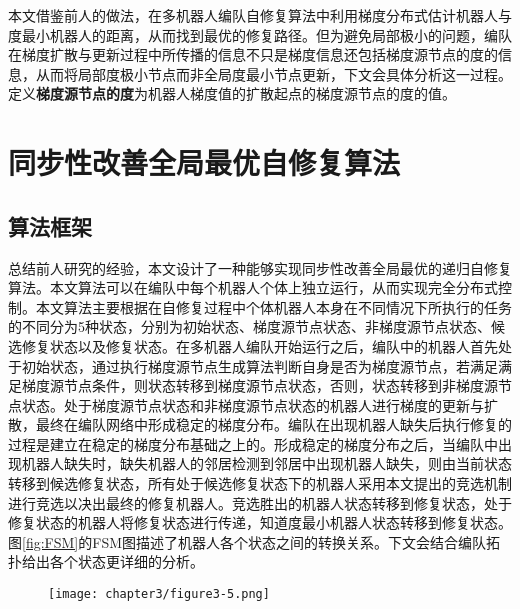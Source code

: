 本文借鉴前人的做法，在多机器人编队自修复算法中利用梯度分布式估计机器人与度最小机器人的距离，从而找到最优的修复路径。但为避免局部极小的问题，编队在梯度扩散与更新过程中所传播的信息不只是梯度信息还包括梯度源节点的度的信息，从而将局部度极小节点而非全局度最小节点更新，下文会具体分析这一过程。定义\textbf{梯度源节点的度}为机器人梯度值的扩散起点的梯度源节点的度的值。

\section{同步性改善全局最优自修复算法}

\subsection{算法框架}
总结前人研究的经验，本文设计了一种能够实现同步性改善全局最优的递归自修复算法。本文算法可以在编队中每个机器人个体上独立运行，从而实现完全分布式控制。本文算法主要根据在自修复过程中个体机器人本身在不同情况下所执行的任务的不同分为5种状态，分别为初始状态、梯度源节点状态、非梯度源节点状态、候选修复状态以及修复状态。在多机器人编队开始运行之后，编队中的机器人首先处于初始状态，通过执行梯度源节点生成算法判断自身是否为梯度源节点，若满足满足梯度源节点条件，则状态转移到梯度源节点状态，否则，状态转移到非梯度源节点状态。处于梯度源节点状态和非梯度源节点状态的机器人进行梯度的更新与扩散，最终在编队网络中形成稳定的梯度分布。编队在出现机器人缺失后执行修复的过程是建立在稳定的梯度分布基础之上的。形成稳定的梯度分布之后，当编队中出现机器人缺失时，缺失机器人的邻居检测到邻居中出现机器人缺失，则由当前状态转移到候选修复状态，所有处于候选修复状态下的机器人采用本文提出的竞选机制进行竞选以决出最终的修复机器人。竞选胜出的机器人状态转移到修复状态，处于修复状态的机器人将修复状态进行传递，知道度最小机器人状态转移到修复状态。图\ref{fig:FSM}的FSM图描述了机器人各个状态之间的转换关系。下文会结合编队拓扑给出各个状态更详细的分析。
\begin{figure}[!htbp]
	\centering
	\texttt{[image: chapter3/figure3-5.png]}
\end{figure}


